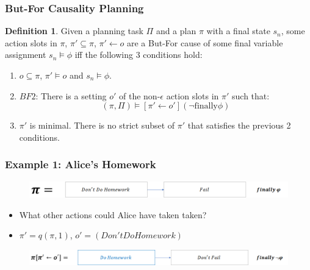 \documentclass{beamer}
\theoremstyle{plain}
\theoremstyle{definition}
\newtheorem{defn}[thm]{Definition} %
\begin{document}
\begin{frame}
\frametitle{But-For Causality Planning}
\begin{defn} 

Given a planning task $\Pi$ and a plan $\pi$ with a final state $s_n$, some action slots in $\pi$, $\pi' \subseteq \pi$, $\pi' \leftarrow o$ are a But-For cause of some final variable assignment $s_n \models \phi$ iff the following 3 conditions hold:
\begin{enumerate}
\item  $o \subseteq \pi$, $\pi' \models o$ and $s_n \models \phi$.
\item $BF2$: There is a setting $o'$ of the non-$\epsilon$ action slots in $\pi'$ such that:
\[
(\pi, \Pi) \models [\pi' \leftarrow o'](\lnot \textrm{finally} \phi)
\]
\item $\pi'$ is minimal. There is no strict subset of $\pi'$ that satisfies the previous 2 conditions.
\end{enumerate}


\end{defn}

\end{frame}
\begin{frame}
\frametitle{Example 1: Alice's Homework}
\begin{figure}
\includegraphics[scale=.35]{alicePlan}
\end{figure}

\begin{itemize}
\item What other actions could Alice have taken taken?
\item $\pi'= q(\pi,1)$, $o'=(Don't Do Homework)$
\end{itemize}

\begin{figure}
\includegraphics[scale=.35]{alicePlanCounterfactual}
\end{figure}
\end{frame}
\end{document}
